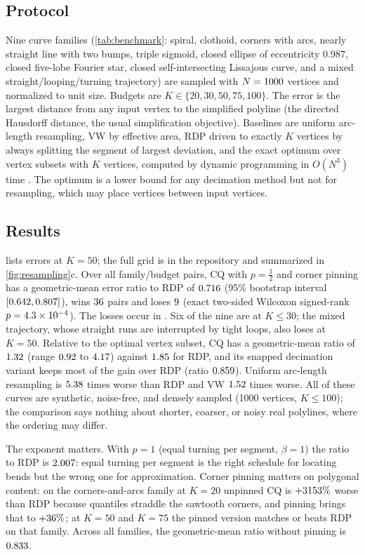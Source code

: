 \documentclass[11pt]{amsart}
\theoremstyle{definition}
\theoremstyle{remark}
\begin{document}
\subsection{Protocol}
Nine curve families (\cref{tab:benchmark}: spiral, clothoid, corners with arcs, nearly straight line with two bumps, triple sigmoid, closed ellipse of eccentricity $0.987$, closed five-lobe Fourier star, closed self-intersecting Lissajous curve, and a mixed straight/looping/turning trajectory) are sampled with $N=1000$ vertices and normalized to unit size. Budgets are $K\in\{20,30,50,75,100\}$. The error is the largest distance from any input vertex to the simplified polyline (the directed Hausdorff distance, the usual simplification objective). Baselines are uniform arc-length resampling, VW by effective area, RDP driven to exactly $K$ vertices by always splitting the segment of largest deviation, and the exact optimum over vertex subsets with $K$ vertices, computed by dynamic programming in $O(N^3)$ time \cite{imai1986,perez1994,chin1996}. The optimum is a lower bound for any decimation method but not for resampling, which may place vertices between input vertices.

\subsection{Results}
 lists errors at $K=50$; the full grid is in the repository and summarized in \cref{fig:resampling}c. Over all \benchPairs{} family/budget pairs, CQ with $p=\tfrac12$ and corner pinning has a geometric-mean error ratio to RDP of $0.716$ (95\% bootstrap interval $[0.642,0.807]$), wins $36$ pairs and loses $9$ (exact two-sided Wilcoxon signed-rank $p=4.3\times10^{-4}$). The losses occur in \benchLossFamilies. Six of the nine are at $K\le30$; the mixed trajectory, whose straight runs are interrupted by tight loops, also loses at $K=50$. Relative to the optimal vertex subset, CQ has a geometric-mean ratio of $1.32$ (range $0.92$ to $4.17$) against $1.85$ for RDP, and its snapped decimation variant keeps most of the gain over RDP (ratio $0.859$). Uniform arc-length resampling is $5.38$ times worse than RDP and VW $1.52$ times worse. All of these curves are synthetic, noise-free, and densely sampled (1000 vertices, $K\le 100$); the comparison says nothing about shorter, coarser, or noisy real polylines, where the ordering may differ.

The exponent matters. With $p=1$ (equal turning per segment, $\beta=1$) the ratio to RDP is $2.007$: equal turning per segment is the right schedule for locating bends but the wrong one for approximation. Corner pinning matters on polygonal content: on the corners-and-arcs family at $K=20$ unpinned CQ is $+3153\%$ worse than RDP because quantiles straddle the sawtooth corners, and pinning brings that to $+36\%$; at $K=50$ and $K=75$ the pinned version matches or beats RDP on that family. Across all families, the geometric-mean ratio without pinning is $0.833$.
\end{document}

